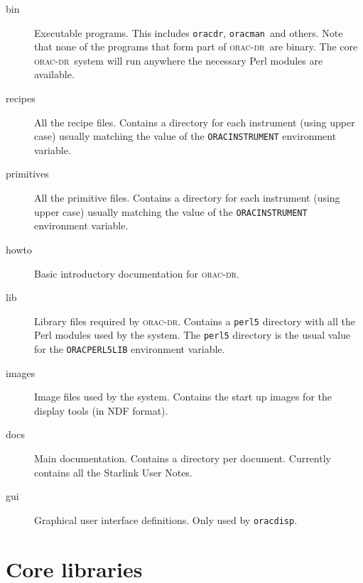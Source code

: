 \documentclass[twoside,11pt]{article}
\renewcommand{\_}{\texttt{\symbol{95}}}
\newcommand{\Oracdr}{\textsc{orac-dr}}
\newcommand{\oracdr}{\texttt{oracdr}}
\newcommand{\oracman}{\texttt{oracman}}
\newcommand{\oracdisp}{\texttt{oracdisp}}
\begin{document}
\begin{description}
\item[bin] \mbox{}

Executable programs. This includes \oracdr, \oracman\ and others. Note
that none of the programs that form part of \Oracdr\ are binary. 
The core \Oracdr\ system will run anywhere the necessary Perl modules
are available.

\item[recipes] \mbox{}

All the recipe files. Contains a directory for each instrument (using
upper case) usually matching the value of the
\texttt{ORAC\_INSTRUMENT} environment variable.

\item[primitives] \mbox{}

All the primitive files. Contains a directory for each instrument
(using upper case) usually matching the value of the
\texttt{ORAC\_INSTRUMENT} environment variable.

\item[howto] \mbox{}

Basic introductory documentation for \Oracdr.

\item[lib] \mbox{}

Library files required by \Oracdr. Contains a \texttt{perl5} directory
with all the Perl modules used by the system. The \texttt{perl5}
directory is the usual value for the \texttt{ORAC\_PERL5LIB}
environment variable.

\item[images] \mbox{}

Image files used by the system. Contains the start up images for the
display tools (in NDF format).

\item[docs] \mbox{}

Main documentation. Contains a directory per document. Currently
contains all the Starlink User Notes.

\item[gui] \mbox{}

Graphical user interface definitions. Only used by \oracdisp.

\end{description}






\section{Core libraries}







\end{document}
